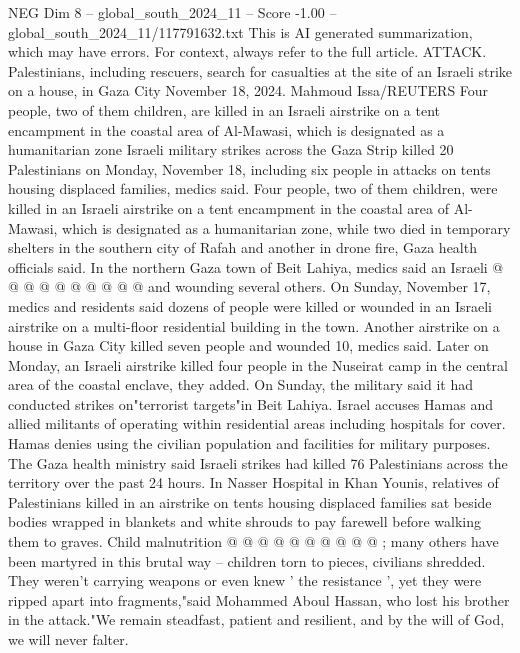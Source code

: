 \begin{textsample}{NEG Dim 8 – global\_south\_2024\_11 – Score -1.00 – global\_south\_2024\_11/117791632.txt}  \label{ex:f8_neg_312}
This is AI generated summarization, which may have errors.
For context, always refer to the full article.
ATTACK.
Palestinians, including rescuers, search for casualties at the site of an Israeli strike on a house, in Gaza City November 18, 2024.
Mahmoud Issa/REUTERS Four people, two of them children, are killed in an Israeli airstrike on a tent encampment in the coastal area of Al-Mawasi, which is designated as a humanitarian zone Israeli military strikes across the Gaza Strip killed 20 Palestinians on Monday, November 18, including six people in attacks on tents housing displaced families, medics said.
Four people, two of them children, were killed in an Israeli airstrike on a tent encampment in the coastal area of Al-Mawasi, which is designated as a humanitarian zone, while two died in temporary shelters in the southern city of Rafah and another in drone fire, Gaza health officials said.
In the northern Gaza town of Beit Lahiya, medics said an Israeli @ @ @ @ @ @ @ @ @ @ and wounding several others.
On Sunday, November 17, medics and residents said dozens of people were killed or wounded in an Israeli airstrike on a multi-floor residential building in the town.
Another airstrike on a house in Gaza City killed seven people and wounded 10, medics said.
Later on Monday, an Israeli airstrike killed four people in the Nuseirat camp in the central area of the coastal enclave, they added.
On Sunday, the military said it had conducted strikes on"terrorist targets"in Beit Lahiya.
Israel accuses Hamas and allied militants of operating within residential areas including hospitals for cover.
Hamas denies using the civilian population and facilities for military purposes.
The Gaza health ministry said Israeli strikes had killed 76 Palestinians across the territory over the past 24 hours.
In Nasser Hospital in Khan Younis, relatives of Palestinians killed in an airstrike on tents housing displaced families sat beside bodies wrapped in blankets and white shrouds to pay farewell before walking them to graves.
Child malnutrition @ @ @ @ @ @ @ @ @ @ ; many others have been martyred in this brutal way -- children torn to pieces, civilians shredded.
They weren't carrying weapons or even knew ' the resistance ', yet they were ripped apart into fragments,"said Mohammed Aboul Hassan, who lost his brother in the attack."We remain steadfast, patient and resilient, and by the will of God, we will never falter.

\end{textsample}

